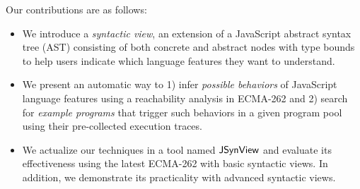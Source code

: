 Our contributions are as follows:
\begin{itemize}
  \item We introduce a \textit{syntactic view}, an extension of a JavaScript
    abstract syntax tree (AST) consisting of both concrete and abstract nodes
    with type bounds to help users indicate which language features
    they want to understand.

  \item We present an automatic way to 1) infer \textit{possible behaviors} of
    JavaScript language features using a reachability analysis in ECMA-262 and
    2) search for \textit{example programs} that trigger such behaviors in a given
    program pool using their pre-collected execution traces.

  \item We actualize our techniques in a tool named $\tool$ and evaluate its
    effectiveness using the latest ECMA-262 with  basic syntactic
    views. In addition, we demonstrate its practicality with 
    advanced syntactic views.
\end{itemize}
